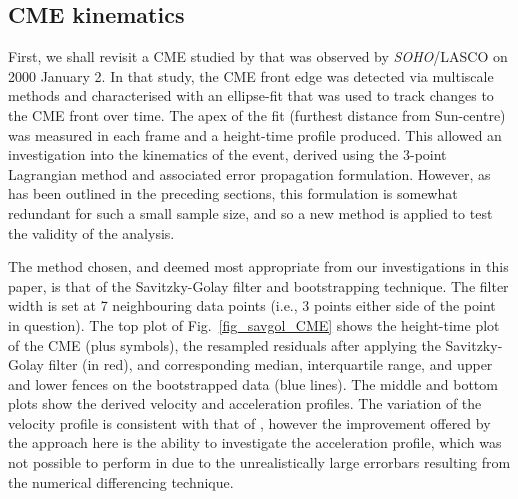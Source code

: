 \documentclass[structabstract]{aa}
\begin{document}
\subsection{CME kinematics}
\label{subsect:corimp}


First, we shall revisit a CME studied by \citet{2009A&A...495..325B} that was observed by \emph{SOHO}/LASCO on 2000 January 2. In that study, the CME front edge was detected via multiscale methods and characterised with an ellipse-fit that was used to track changes to the CME front over time. The apex of the fit (furthest distance from Sun-centre) was measured in each frame and a height-time profile produced. This allowed an investigation into the kinematics of the event, derived using the 3-point Lagrangian method and associated error propagation formulation. However, as has been outlined in the preceding sections, this formulation is somewhat redundant for such a small sample size, and so a new method is applied to test the validity of the analysis.

The method chosen, and deemed most appropriate from our investigations in this paper, is that of the Savitzky-Golay filter and bootstrapping technique. The filter width is set at 7 neighbouring data points (i.e., 3 points either side of the point in question). The top plot of Fig.~\ref{fig_savgol_CME} shows the height-time plot of the CME (plus symbols), the resampled residuals after applying the Savitzky-Golay filter (in red), and corresponding median, interquartile range, and upper and lower fences on the bootstrapped data (blue lines). The middle and bottom plots show the derived velocity and acceleration profiles. The variation of the velocity profile is consistent with that of \citet{2009A&A...495..325B}, however the improvement offered by the approach here is the ability to investigate the acceleration profile, which was not possible to perform in \citet{2009A&A...495..325B} due to the unrealistically large errorbars resulting from the numerical differencing technique.
\end{document}
